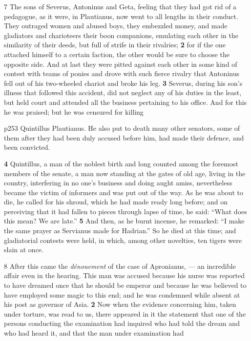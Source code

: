 7 The sons of Severus, Antoninus and Geta, feeling that they had got rid of a pedagogue, as it were, in Plautianus, now went to all lengths in their conduct. They outraged women and abused boys, they embezzled money, and made gladiators and charioteers their boon companions, emulating each other in the similarity of their deeds, but full of strife in their rivalries; \textbf{2} for if the one attached himself to a certain faction, the other would be sure to choose the opposite side. And at last they were pitted against each other in some kind of contest with teams of ponies and drove with such fierce rivalry that Antoninus fell out of his two-wheeled chariot and broke his leg. \textbf{3} Severus, during his son's illness that followed this accident, did not neglect any of his duties in the least, but held court and attended all the business pertaining to his office. And for this he was praised; but he was censured for killing

p253 Quintillus Plautianus. He also put to death many other senators, some of them after they had been duly accused before him, had made their defence, and been convicted.

\textbf{4} Quintillus, a man of the noblest birth and long counted among the foremost members of the senate, a man now standing at the gates of old age, living in the country, interfering in no one's business and doing aught amiss, nevertheless became the victim of informers and was put out of the way. As he was about to die, he called for his shroud, which he had made ready long before; and on perceiving that it had fallen to pieces through lapse of time, he said: ``What does this mean? We are late.'' \textbf{5} And then, as he burnt incense, he remarked: ``I make the same prayer as Servianus made for Hadrian.'' So he died at this time; and gladiatorial contests were held, in which, among other novelties, ten tigers were slain at once.

8 After this came the \emph{dénouement} of the case of Apronianus, \texthebrew{—} an incredible affair even in the hearing. This man was accused because his nurse was reported to have dreamed once that he should be emperor and because he was believed to have employed some magic to this end; and he was condemned while absent at his post as governor of Asia. \textbf{2} Now when the evidence concerning him, taken under torture, was read to us, there appeared in it the statement that one of the persons conducting the examination had inquired who had told the dream and who had heard it, and that the man under examination had

